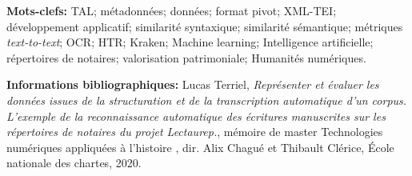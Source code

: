 \textbf{Mots-clefs:} TAL; métadonnées; données; format pivot; XML-TEI; développement applicatif; similarité syntaxique; similarité sémantique; métriques \textit{text-to-text}; OCR; HTR; Kraken; Machine learning; Intelligence artificielle; répertoires de notaires; valorisation patrimoniale; Humanités numériques.

\bigskip
\bigskip
\bigskip

\textbf{Informations bibliographiques:} Lucas Terriel, \textit{Représenter et évaluer les données issues de la structuration et de la transcription automatique d'un corpus. L'exemple de la reconnaissance automatique des écritures manuscrites sur les répertoires de notaires du projet Lectaurep.}, mémoire de master \og Technologies numériques appliquées à l'histoire \fg{}, dir. Alix Chagué et Thibault Clérice, École nationale des chartes, 2020.

\clearpage
\thispagestyle{empty}
\cleardoublepage